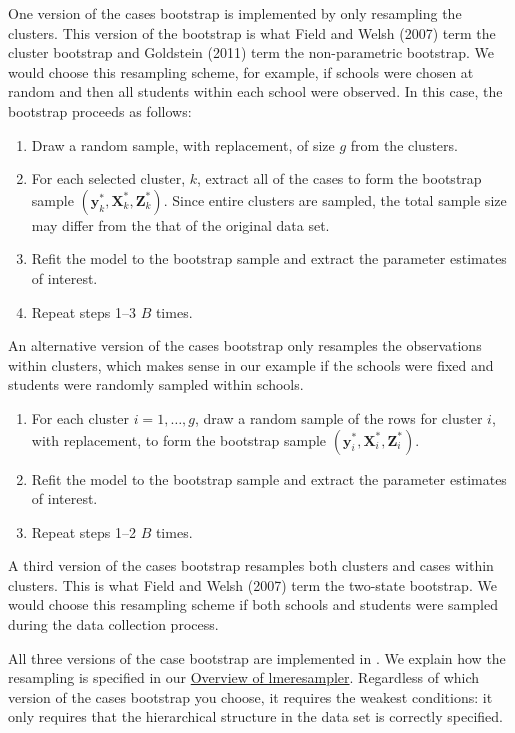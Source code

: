 One version of the cases bootstrap is implemented by only
resampling the clusters. This version of the bootstrap is what Field and Welsh (2007) term the
cluster bootstrap and Goldstein (2011) term the non-parametric bootstrap. We would choose this resampling scheme, for example, if schools were chosen at random and then all students within each school were observed. In this case, the bootstrap proceeds as follows:

\begin{enumerate}
\def\labelenumi{\arabic{enumi}.}
\tightlist
\item
  Draw a random sample, with replacement, of size \(g\) from the
  clusters.
\item
  For each selected cluster, \(k\), extract all of the cases to form the
  bootstrap sample \(\left(\boldsymbol{y}^*_k, \boldsymbol{X}^*_k, \boldsymbol{Z}^*_k \right)\).
  Since entire clusters are sampled, the total sample size may differ from the that of the original data set.
\item
  Refit the model to the bootstrap sample and extract the parameter
  estimates of interest.
\item
  Repeat steps 1--3 \(B\) times.
\end{enumerate}

\noindent An alternative version of the cases bootstrap only resamples the
observations within clusters, which makes sense in our example
if the schools were fixed and students were randomly sampled within schools.

\begin{enumerate}
\def\labelenumi{\arabic{enumi}.}
\tightlist
\item
  For each cluster \(i=1,\ldots,g\), draw a random sample of the rows for cluster \(i\), with
  replacement, to form the bootstrap sample
  \(\left(\boldsymbol{y}^*_i, \boldsymbol{X}^*_i, \boldsymbol{Z}^*_i \right)\).
\item
  Refit the model to the bootstrap sample and extract the parameter
  estimates of interest.
\item
  Repeat steps 1--2 \(B\) times.
\end{enumerate}

\noindent A third version of the cases bootstrap resamples both clusters and cases
within clusters. This is what Field and Welsh (2007) term the two-state bootstrap.
We would choose this resampling scheme if both schools and
students were sampled during the data collection process.

\noindent All three versions of the case bootstrap are implemented in . We explain how the resampling is specified in our \protect\hyperlink{overview-of-lmeresampler}{Overview of lmeresampler}. Regardless of which version of the cases bootstrap you choose, it requires the weakest conditions: it only requires that the hierarchical structure in the data set is correctly specified.

